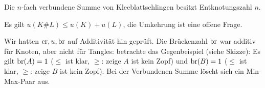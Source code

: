 \begin{kor}
    Die $n$-fach verbundene Summe von Kleeblattschlingen besitzt Entknotungszahl $n$.
\end{kor}

\begin{note}
    Es gilt $u(K \# L) \le u(K) + u(L)$, die Umkehrung ist eine offene Frage.
\end{note}

Wir hatten $\operatorname{cr}, u, \operatorname { br }$ auf Additivität hin geprüft. Die Brückenzahl $\operatorname { br }$ war additiv für Knoten, aber nicht für Tangles:
betrachte das Gegenbeispiel (siehe Skizze):
Es gilt $\operatorname { br }(A) = 1$ ($\le$ ist klar, $\ge$: zeige $A$ ist kein Zopf) und $\operatorname { br }(B) = 1$ ($\le$ ist klar, $\ge$: zeige $B$ ist kein Zopf).
Bei der Verbundenen Summe löscht sich ein Min-Max-Paar aus.




